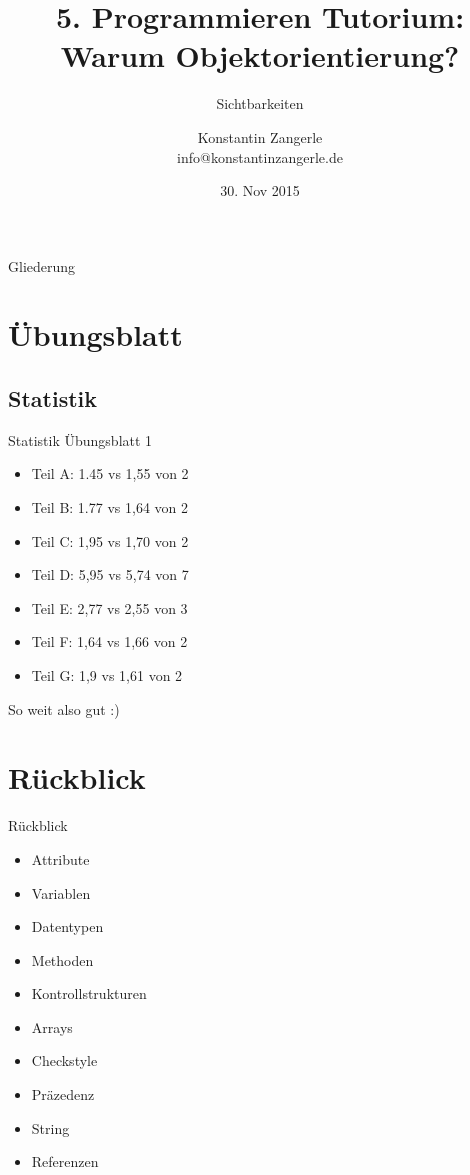 \documentclass[18pt]{beamer}
\title[Programmieren Tutorium]{5. Programmieren Tutorium:\texorpdfstring{\\}{} Warum Objektorientierung?}
\subtitle{Sichtbarkeiten}
\author{Konstantin Zangerle \texorpdfstring{\\}{} info@konstantinzangerle.de}
\date{30. Nov 2015}
\begin{document}

\begin{frame}
\titlepage
\end{frame}

\begin{frame}{Gliederung}
\tableofcontents
\end{frame}

\section{Übungsblatt}

\subsection{Statistik}
\begin{frame}{Statistik Übungsblatt 1}
\begin{itemize}
 \item Teil A: 1.45 vs 1,55 von 2 
 \item Teil B: 1.77 vs 1,64 von 2 	
 \item Teil C: 1,95 vs 1,70 von 2 	
 \item Teil D: 5,95 vs 5,74 von 7	
 \item Teil E: 2,77 vs 2,55 von 3
 \item Teil F: 1,64 vs 1,66 von 2
 \item Teil G: 1,9 vs 1,61 von 2
\end{itemize}
So weit also gut :)
\end{frame}


\section{Rückblick}
\begin{frame}{Rückblick}
 \begin{itemize}
  \item Attribute
  \item Variablen
  \item Datentypen
  \item Methoden
  \item Kontrollstrukturen
  \item Arrays
  \item Checkstyle
  \item Präzedenz
  \item String
  \item Referenzen
 \end{itemize}
\end{frame}
\end{document}
